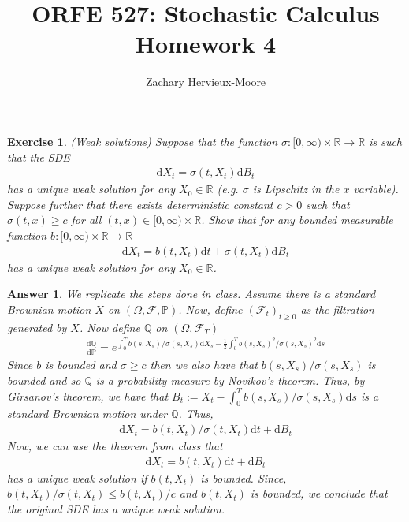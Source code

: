 \documentclass[12pt]{article}
\title{ORFE 527: Stochastic Calculus \\ Homework 4}
\author{Zachary Hervieux-Moore}
\date{\displaydate{date}}
\theoremstyle{colon}
\newtheorem{exercise}{Exercise}
\newtheorem*{answer}{Answer}
\begin{document}
\maketitle

\clearpage

\begin{exercise}
  (Weak solutions) Suppose that the function $\sigma: [0, \infty) \times \mathbb{R} \rightarrow \mathbb{R}$ is such that the SDE
  \begin{gather*}
    \text{d} X_t = \sigma(t, X_t) \text{d} B_t
  \end{gather*}
  has a unique weak solution for any $X_0 \in \mathbb{R}$ (e.g. $\sigma$ is Lipschitz in the $x$ variable). Suppose further that there exists  deterministic constant $c > 0$ such that $\sigma(t,x) \geq c$ for all $(t,x) \in [0,\infty) \times \mathbb{R}$. Show that for any bounded measurable function $b : [0, \infty) \times \mathbb{R} \rightarrow \mathbb{R}$
  \begin{gather*}
    \text{d} X_t = b(t, X_t) \text{d}t + \sigma(t, X_t) \text{d} B_t
  \end{gather*}
  has a unique weak solution for any $X_0 \in \mathbb{R}$.
\end{exercise}

\begin{answer}
  We replicate the steps done in class. Assume there is a standard Brownian motion $X$ on $(\Omega, \mathcal{F}, \mathbb{P})$. Now, define $(\mathcal{F}_t)_{t \geq 0}$ as the filtration generated by $X$. Now define $\mathbb{Q}$ on $(\Omega, \mathcal{F}_T)$
  \begin{gather*}
    \frac{\text{d} \mathbb{Q}}{\text{d} \mathbb{P}} = e^{\int_0^T b(s,X_s)/\sigma(s, X_s) \text{d} X_s - \frac{1}{2} \int_0^T b(s,X_s)^2/\sigma(s, X_s)^2 \text{d} s}
  \end{gather*}
  Since $b$ is bounded and $\sigma \geq c$ then we also have that $b(s,X_s)/\sigma(s, X_s)$ is bounded and so $\mathbb{Q}$ is a probability measure by Novikov's theorem. Thus, by Girsanov's theorem, we have that $B_t := X_t - \int_0^T b(s,X_s)/\sigma(s, X_s) \text{d} s$ is a standard Brownian motion under $\mathbb{Q}$. Thus,
  \begin{gather*}
    \text{d} X_t = b(t,X_t)/\sigma(t, X_t) \text{d} t + \text{d} B_t
  \end{gather*}
  Now, we can use the theorem from class that
  \begin{gather*}
    \text{d} X_t = b(t,X_t) \text{d} t + \text{d} B_t
  \end{gather*}
  has a unique weak solution if $b(t,X_t)$ is bounded. Since, $b(t,X_t)/\sigma(t, X_t) \leq b(t,X_t)/c$ and $b(t,X_t)$ is bounded, we conclude that the original SDE has a unique weak solution.
\end{answer}
\end{document}
